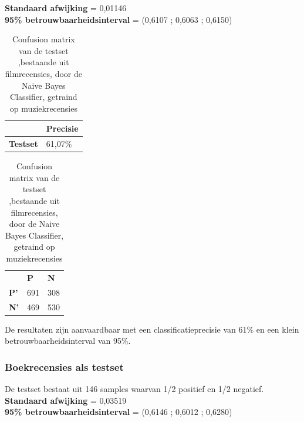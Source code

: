 \textbf{Standaard afwijking} = 0,01146\\
\textbf{95\% betrouwbaarheidsinterval} = (0,6107 ; 0,6063 ; 0,6150)
 
\begin{table}[h]
\centering
\setlength\tabcolsep{4pt}
\begin{minipage}[t]{0.48\textwidth}
\centering
\begin{tabular}{l|l|}
\cline{2-2}
                                            & \textbf{Precisie} \\ \hline
\multicolumn{1}{|l|}{\textbf{Testset}}      & 61,07\%           \\ \hline
\end{tabular}
\caption{Classificatieprecisie Naive Bayes Classifier, getraind op muziekrecensies, getest op filmrecensies}
\end{minipage}%
\hfill
\begin{minipage}[t]{0.48\textwidth}
\centering
\begin{tabular}{lll}
                                 & \textbf{P}               & \textbf{N}               \\ \cline{2-3} 
\multicolumn{1}{l|}{\textbf{P'}} & \multicolumn{1}{l|}{691} & \multicolumn{1}{l|}{308} \\ \cline{2-3} 
\multicolumn{1}{l|}{\textbf{N'}} & \multicolumn{1}{l|}{469} & \multicolumn{1}{l|}{530} \\ \cline{2-3} 
\end{tabular}
\caption{Confusion matrix van de testset ,bestaande uit filmrecensies, door de  Naive Bayes Classifier, getraind op muziekrecensies} 
\end{minipage}
\end{table}

De resultaten zijn aanvaardbaar met een classificatieprecisie van 61\% en een klein betrouwbaarheidsinterval van 95\%.

\subsubsection{Boekrecensies als testset}\label{Boekrecensies als testset}

De testset bestaat uit 146 samples waarvan 1/2 positief en 1/2 negatief.\\

\textbf{Standaard afwijking} = 0,03519\\
\textbf{95\% betrouwbaarheidsinterval} = (0,6146 ; 0,6012 ; 0,6280)
 
